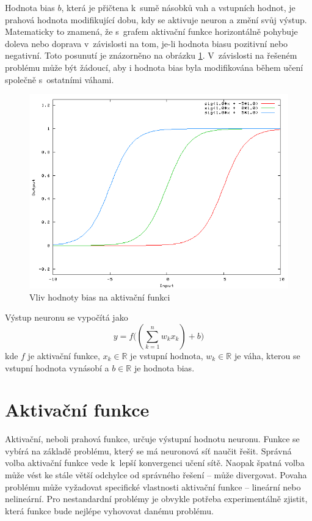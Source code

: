 Hodnota bias $b$, která je přičtena k~sumě násobků vah a vstupních hodnot, je prahová hodnota modifikující dobu, kdy se aktivuje neuron a změní svůj výstup. Matematicky to znamená, že s~grafem aktivační funkce horizontálně pohybuje doleva nebo doprava v~závislosti na tom, je-li hodnota biasu pozitivní nebo negativní. Toto posunutí je znázorněno na obrázku \ref{fig:bias}. V~závislosti na řešeném problému může být žádoucí, aby i hodnota bias byla modifikována během učení společně s~ostatními váhami.

\begin{figure}[H]
    \centering
    \includegraphics[scale=0.4]{obrazky-figures/bias.png}
    \caption{\label{fig:bias}Vliv hodnoty bias na aktivační funkci}
\end{figure}


Výstup neuronu se vypočítá jako
\begin{equation}
	y = f\Big((\sum_{k=1}^n w_kx_k) + b\Big)
\end{equation}
kde $f$ je aktivační funkce, $x_k \in \mathbb{R}$ je vstupní hodnota, $w_k \in \mathbb{R}$ je váha, kterou se vstupní hodnota vynásobí a $b \in \mathbb{R}$ je hodnota bias.


\section{Aktivační funkce}
Aktivační, neboli prahová funkce, určuje výstupní hodnotu neuronu. Funkce se vybírá na základě problému, který se má neuronová síť naučit řešit. Správná volba aktivační funkce vede k~lepší konvergenci učení sítě. Naopak špatná volba může vést ke stále větší odchylce od správného řešení -- může divergovat. Povaha problému může vyžadovat specifické vlastnosti aktivační funkce -- lineární nebo nelineární. Pro nestandardní problémy je obvykle potřeba experimentálně zjistit, která funkce bude nejlépe vyhovovat danému problému. 

